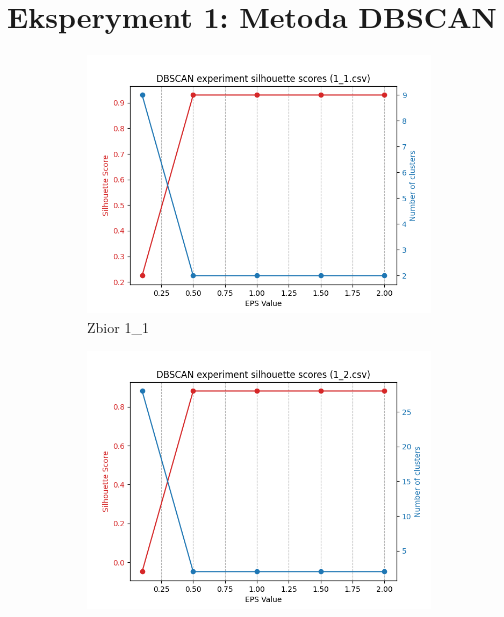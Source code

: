 \documentclass[12pt]{article}
\begin{document}
\section{Eksperyment 1: Metoda DBSCAN}
\begin{figure}[H]
    \centering
    \begin{subfigure}[b]{0.3\textwidth}
        \includegraphics[width=\linewidth]{img/exp_1/dbscan/1_1_scores.png}
        \caption{Zbior 1\_1}
    \end{subfigure}
    \hfill
    \begin{subfigure}[b]{0.3\textwidth}
        \includegraphics[width=\linewidth]{img/exp_1/dbscan/1_2_scores.png}

\end{subfigure}
\end{figure}
\end{document}
